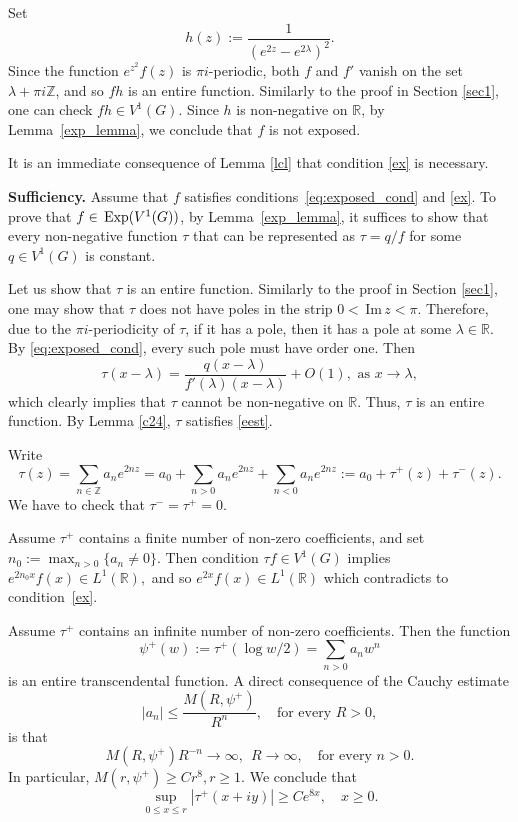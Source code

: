 \documentclass[12pt]{amsart}
\numberwithin{equation}{section}
\theoremstyle{plain}
\theoremstyle{definition}
\newcommand{\R}{{\mathbb R}} \newcommand{\Q}{{\mathbb Q}} \newcommand{\Z}{{\mathbb Z}} \newcommand{\N}{{\mathbb N}}
\newcommand{\expo}{\,{\rm Exp}}
\begin{document}
    Set 
    $$
    h(z):=\frac{1}{(e^{2z}- e^{2\lambda})^2}.
    $$
    Since the function $e^{z^2}f(z)$ is $\pi i$-periodic, both $f$ and $f'$ vanish on the set $\lambda+\pi i\Z$, and so   $fh$ is an entire function. Similarly  to the proof in Section \ref{sec1}, one can check $fh\in V^1(G)$.
    Since $h$ is non-negative on $\R$, by Lemma~\ref{exp_lemma}, we conclude that $f$ is not exposed. 

It is an immediate consequence of 
Lemma \ref{lcl} that condition \eqref{ex} is necessary.
 

{\bf Sufficiency.}
    Assume that $f$ satisfies conditions~\eqref{eq:exposed_cond} and \eqref{ex}. To prove that $f\in \expo(V^1(G))$, by Lemma~\ref{exp_lemma}, it suffices to show that every non-negative function $\tau$ that can be represented as $\tau = q/f$ for some $q \in V^1(G)$ is constant.
    
  Let us show that $\tau$ is an entire function. Similarly to the proof in Section \ref{sec1}, one may show that $\tau$ does not have poles in the strip $0<\,$Im$\,z<\pi$.
  Therefore, due to  the $\pi i$-periodicity of $\tau$, if it has a pole, then it has a pole at some $\lambda\in\R$. By \eqref{eq:exposed_cond}, every such pole must have order one.
Then $$\tau(x-\lambda)= \frac{q(x-\lambda)}{f'(\lambda)(x-\lambda)}+O(1), \text{ as } x\to \lambda,$$which clearly implies that $\tau$ cannot be non-negative on $\R$. Thus, $\tau$ is an entire function.
 By Lemma  \ref{c24}, $\tau$ satisfies \eqref{eest}.

Write
$$\tau(z)=\sum_{n\in\Z}a_ne^{2nz}=a_0+\sum_{n>0}a_ne^{2nz}+\sum_{n<0}a_ne^{2nz}:=a_0+\tau^+(z)+\tau^-(z).$$We have to check that $\tau^-=\tau^+=0.$ 

Assume  $\tau^+$ contains a finite number of non-zero coefficients, and set $n_0:=\max_{n>0}\{a_n\ne0\}$. Then condition $\tau f\in V^1(G)$ implies $e^{2n_0 x}f(x)\in L^1(\R),$ and so $e^{2x}f(x)\in L^1(\R)$ which contradicts to condition~\eqref{ex}. 

Assume  $\tau^+$ contains an infinite number of non-zero coefficients. Then the function $$\psi^+(w):=\tau^+(\log w/2)=\sum_{n>0}a_nw^n$$ is an entire transcendental function. A direct consequence of the Cauchy estimate
$$|a_n|\leq\frac{M(R,\psi^+)}{R^n},\quad \text{for every } R>0,$$ is that $$M(R,\psi^+)R^{-n}\to\infty,\ \ R\to\infty,\quad \text{for every }n>0.$$
In particular, $M(r,\psi^+)\geq Cr^8, r\geq 1$. We conclude that $$\sup_{0\leq x\leq r}|\tau^+(x+iy)|\geq Ce^{8x},\quad x\geq 0.$$
\end{document}
